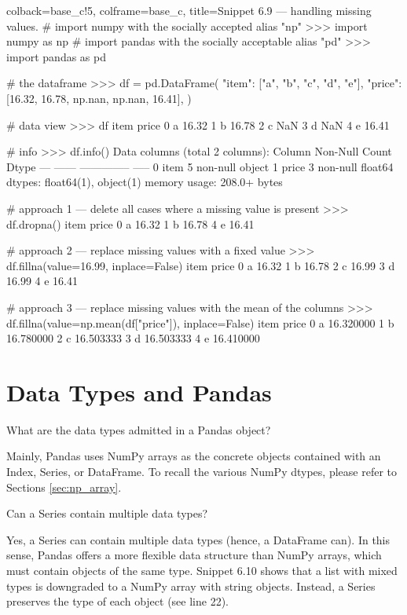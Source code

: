 \documentclass[a4paper,11pt]{book}
\newcommand{\question}[1]{%
    \begin{tcolorbox}[colback=comp_c!10,colframe=comp_c,sidebyside align=top,width=\linewidth,before skip=1ex]
        #1
    \end{tcolorbox}
    \switchcolumn%
}
\newcommand{\note}[1]{%
    \begin{tcolorbox}[colback=white!0,colframe=white!10,width=\linewidth,before skip=1ex]
        #1
    \end{tcolorbox}
}
\begin{document}
\begin{pythoncode}[linenos=True]{colback=base_c!5, colframe=base_c, title=\sffamily Snippet 6.9 --- handling missing values}.
# import numpy with the socially accepted alias "np"
>>> import numpy as np
# import pandas with the socially acceptable alias "pd"
>>> import pandas as pd 

# the dataframe
>>> df = pd.DataFrame(
	{
	    "item": ["a", "b", "c", "d", "e"],
	    "price": [16.32, 16.78, np.nan, np.nan, 16.41],
	}
)

# data view 
>>> df
  item  price
0    a  16.32
1    b  16.78
2    c    NaN
3    d    NaN
4    e  16.41

# info 
>>> df.info()
Data columns (total 2 columns):
     Column  Non-Null Count  Dtype  
---  ------  --------------  -----  
 0   item    5 non-null      object 
 1   price   3 non-null      float64
dtypes: float64(1), object(1)
memory usage: 208.0+ bytes

# approach 1 --- delete all cases where a missing value is present
>>> df.dropna()
  item  price
0    a  16.32
1    b  16.78
4    e  16.41

# approach 2 --- replace missing values with a fixed value
>>> df.fillna(value=16.99, inplace=False)
  item  price
0    a  16.32
1    b  16.78
2    c  16.99
3    d  16.99
4    e  16.41

# approach 3 --- replace missing values with the mean of the columns
>>> df.fillna(value=np.mean(df["price"]), inplace=False)
  item      price
0    a  16.320000
1    b  16.780000
2    c  16.503333
3    d  16.503333
4    e  16.410000
\end{pythoncode}

\section{Data Types and Pandas} 

\begin{paracol}{2}
	\question{\raggedright What are the data types admitted in a Pandas object?}
	\note{Mainly, Pandas uses NumPy arrays as the concrete objects contained with an Index, Series, or DataFrame. To recall the various NumPy dtypes, please refer to Sections \ref{sec:np_array}.}
\end{paracol}

\begin{paracol}{2}
	\question{\raggedright Can a Series contain multiple data types?}
	\note{Yes, a Series can contain multiple data types (hence, a DataFrame can). In this sense, Pandas offers a more flexible data structure than NumPy arrays, which must contain objects of the same type. Snippet 6.10 shows that a list with mixed types is downgraded to a NumPy array with string objects. Instead, a Series preserves the type of each object (see line 22).}
\end{paracol}
\clearpage
\end{document}
